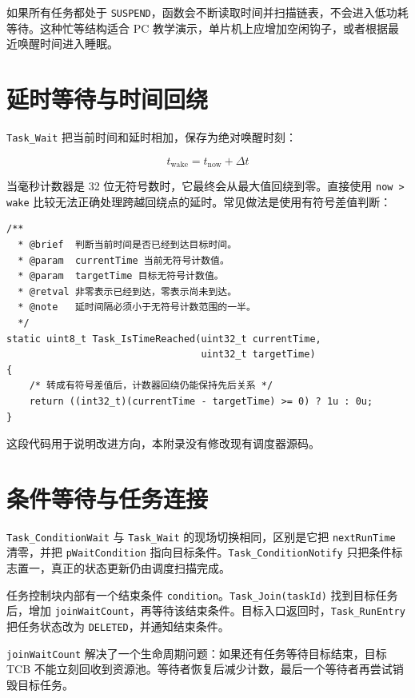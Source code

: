如果所有任务都处于 \texttt{SUSPEND}，函数会不断读取时间并扫描链表，不会进入低功耗等待。这种忙等结构适合 PC 教学演示，单片机上应增加空闲钩子，或者根据最近唤醒时间进入睡眠。

\section{延时等待与时间回绕}

\texttt{Task\_Wait} 把当前时间和延时相加，保存为绝对唤醒时刻：

\begin{equation}
t_{\mathrm{wake}}=t_{\mathrm{now}}+\Delta t
\end{equation}

当毫秒计数器是 32 位无符号数时，它最终会从最大值回绕到零。直接使用 \texttt{now > wake} 比较无法正确处理跨越回绕点的延时。常见做法是使用有符号差值判断：

\begin{lstlisting}[style=c]
/**
  * @brief  判断当前时间是否已经到达目标时间。
  * @param  currentTime 当前无符号计数值。
  * @param  targetTime 目标无符号计数值。
  * @retval 非零表示已经到达，零表示尚未到达。
  * @note   延时间隔必须小于无符号计数范围的一半。
  */
static uint8_t Task_IsTimeReached(uint32_t currentTime,
                                  uint32_t targetTime)
{
    /* 转成有符号差值后，计数器回绕仍能保持先后关系 */
    return ((int32_t)(currentTime - targetTime) >= 0) ? 1u : 0u;
}
\end{lstlisting}

这段代码用于说明改进方向，本附录没有修改现有调度器源码。

\section{条件等待与任务连接}

\texttt{Task\_ConditionWait} 与 \texttt{Task\_Wait} 的现场切换相同，区别是它把 \texttt{nextRunTime} 清零，并把 \texttt{pWaitCondition} 指向目标条件。\texttt{Task\_ConditionNotify} 只把条件标志置一，真正的状态更新仍由调度扫描完成。

任务控制块内部有一个结束条件 \texttt{condition}。\texttt{Task\_Join(taskId)} 找到目标任务后，增加 \texttt{joinWaitCount}，再等待该结束条件。目标入口返回时，\texttt{Task\_RunEntry} 把任务状态改为 \texttt{DELETED}，并通知结束条件。

\texttt{joinWaitCount} 解决了一个生命周期问题：如果还有任务等待目标结束，目标 TCB 不能立刻回收到资源池。等待者恢复后减少计数，最后一个等待者再尝试销毁目标任务。


